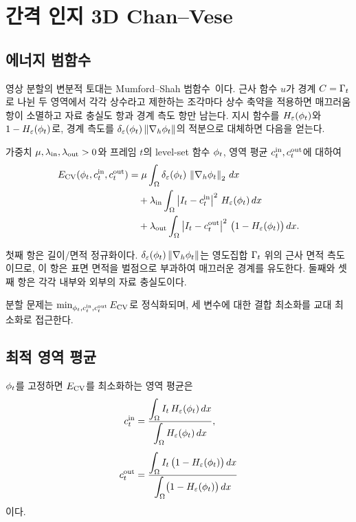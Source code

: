 
\section{간격 인지 3D Chan--Vese}
\label{sec:spacing-aware}

\subsection{에너지 범함수}

영상 분할의 변분적 토대는 Mumford--Shah 범함수~\citep{mumford1989_optimal}이다.
근사 함수 $u$가 경계 $C=\Gamma_t$로 나뉜 두 영역에서 각각 상수라고 제한하는
조각마다 상수 축약을 적용하면 매끄러움 항이 소멸하고 자료 충실도 항과 경계 측도
항만 남는다. 지시 함수를 $H_\varepsilon(\phi_t)$와 $1-H_\varepsilon(\phi_t)$로, 경계 측도를
$\delta_\varepsilon(\phi_t)\left\lVert \nabla_h\phi_t \right\rVert$의 적분으로 대체하면 다음을 얻는다.

\begin{definition}
\label{def:cv-energy}
가중치 $\mu, \lambda_{\mathrm{in}}, \lambda_{\mathrm{out}} > 0$와 프레임 $t$의 level-set 함수 $\phi_t$, 영역 평균
$c^{\mathrm{in}}_t, c^{\mathrm{out}}_t$에 대하여
\begin{align}
  E_{\mathrm{CV}}(\phi_t, c^{\mathrm{in}}_t, c^{\mathrm{out}}_t)
  &= \mu \int_\Omega \delta_\varepsilon(\phi_t)\,\left\lVert \nabla_h\phi_t \right\rVert_2 \,dx \notag\\
  &\quad + \lambda_{\mathrm{in}} \int_\Omega \left\lvert I_t - c^{\mathrm{in}}_t \right\rvert^2\,H_\varepsilon(\phi_t)\,dx \notag\\
  &\quad + \lambda_{\mathrm{out}} \int_\Omega \left\lvert I_t - c^{\mathrm{out}}_t \right\rvert^2\,\bigl(1 - H_\varepsilon(\phi_t)\bigr)\,dx.
  \label{eq:cv-energy}
\end{align}
\end{definition}

첫째 항은 길이/면적 정규화이다. $\delta_\varepsilon(\phi_t)\left\lVert \nabla_h\phi_t \right\rVert$는 영도집합
$\Gamma_t$ 위의 근사 면적 측도이므로, 이 항은 표면 면적을 벌점으로 부과하여 매끄러운
경계를 유도한다. 둘째와 셋째 항은 각각 내부와 외부의 자료 충실도이다.

분할 문제는 $\min_{\phi_t,c^{\mathrm{in}}_t,c^{\mathrm{out}}_t}E_{\mathrm{CV}}$로 정식화되며, 세 변수에 대한 결합 최소화를
교대 최소화로 접근한다.

\subsection{최적 영역 평균}

\begin{proposition}[최적 영역 평균]
\label{prop:region-means}
$\phi_t$를 고정하면 $E_{\mathrm{CV}}$를 최소화하는 영역 평균은
\begin{align}
  c^{\mathrm{in}}_t  &= \frac{\displaystyle\int_\Omega I_t\,H_\varepsilon(\phi_t)\,dx}
                {\displaystyle\int_\Omega H_\varepsilon(\phi_t)\,dx},
  \label{eq:cin}\\[0.4em]
  c^{\mathrm{out}}_t &= \frac{\displaystyle\int_\Omega I_t\,\bigl(1-H_\varepsilon(\phi_t)\bigr)\,dx}
                {\displaystyle\int_\Omega \bigl(1-H_\varepsilon(\phi_t)\bigr)\,dx}
  \label{eq:cout}
\end{align}
이다.
\end{proposition}


